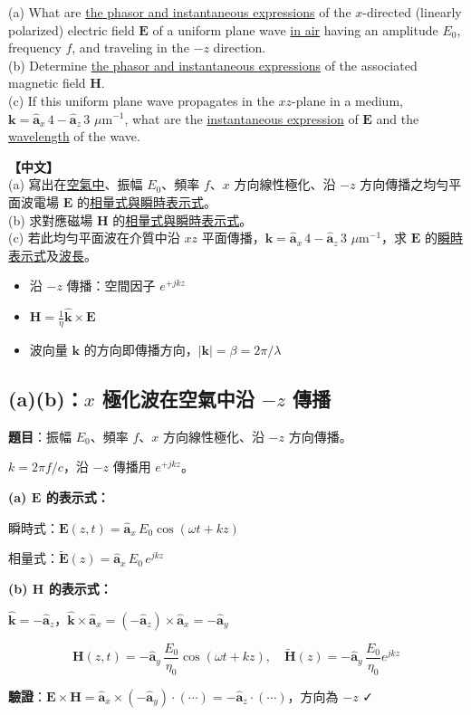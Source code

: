 \documentclass[12pt,a4paper]{article}
\newcommand{\vE}{\mathbf{E}}
\newcommand{\vH}{\mathbf{H}}
\newcommand{\vk}{\mathbf{k}}
\newcommand{\ax}{\hat{\mathbf{a}}_x}
\newcommand{\ay}{\hat{\mathbf{a}}_y}
\newcommand{\az}{\hat{\mathbf{a}}_z}
\begin{document}
\begin{questionbox}
(a) What are \underline{the phasor and instantaneous expressions} of the $x$-directed (linearly polarized) electric field $\vE$ of a uniform plane wave \underline{in air} having an amplitude $E_0$, frequency $f$, and traveling in the $-z$ direction.\\
(b) Determine \underline{the phasor and instantaneous expressions} of the associated magnetic field $\vH$.\\
(c) If this uniform plane wave propagates in the $xz$-plane in a medium, $\vk = \ax\,4 - \az\,3$ $\mu$m$^{-1}$, what are the \underline{instantaneous expression} of $\vE$ and the \underline{wavelength} of the wave.

\medskip\noindent\textbf{【中文】}\\
(a) 寫出在\underline{空氣中}、振幅 $E_0$、頻率 $f$、$x$ 方向線性極化、沿 $-z$ 方向傳播之均勻平面波電場 $\vE$ 的\underline{相量式與瞬時表示式}。\\
(b) 求對應磁場 $\vH$ 的\underline{相量式與瞬時表示式}。\\
(c) 若此均勻平面波在介質中沿 $xz$ 平面傳播，$\vk = \ax\,4 - \az\,3$ $\mu$m$^{-1}$，求 $\vE$ 的\underline{瞬時表示式}及\underline{波長}。
\end{questionbox}

\begin{conceptbox}[核心概念]
\begin{itemize}
  \item 沿 $-z$ 傳播：空間因子 $e^{+jkz}$
  \item $\vH = \frac{1}{\eta}\hat{\vk}\times\vE$
  \item 波向量 $\vk$ 的方向即傳播方向，$|\vk| = \beta = 2\pi/\lambda$
\end{itemize}
\end{conceptbox}

\subsection*{(a)(b)：$x$ 極化波在空氣中沿 $-z$ 傳播}

\textbf{題目}：振幅 $E_0$、頻率 $f$、$x$ 方向線性極化、沿 $-z$ 方向傳播。

\begin{solutionbox}[詳解]

$k = 2\pi f/c$，沿 $-z$ 傳播用 $e^{+jkz}$。

\textbf{(a) $\vE$ 的表示式：}

瞬時式：$\vE(z,t) = \ax\,E_0\cos(\omega t + kz)$

相量式：$\tilde{\vE}(z) = \ax\,E_0\,e^{jkz}$

\textbf{(b) $\vH$ 的表示式：}

$\hat{\vk} = -\az$，$\hat{\vk}\times\ax = (-\az)\times\ax = -\ay$

\[
  \boxed{\vH(z,t) = -\ay\,\frac{E_0}{\eta_0}\cos(\omega t + kz), \quad
  \tilde{\vH}(z) = -\ay\,\frac{E_0}{\eta_0}e^{jkz}}
\]

\textbf{驗證}：$\vE\times\vH = \ax\times(-\ay)\cdot(\cdots) = -\az\cdot(\cdots)$，方向為 $-z$ ✓
\end{solutionbox}
\end{document}
